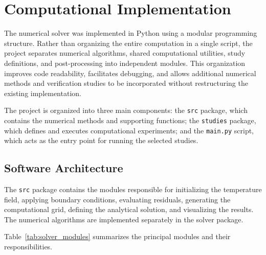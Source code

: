 \section{Computational Implementation}

The numerical solver was implemented in Python using a modular programming structure. Rather than organizing the entire computation in a single script, the project separates numerical algorithms, shared computational utilities, study definitions, and post-processing into independent modules. This organization improves code readability, facilitates debugging, and allows additional numerical methods and verification studies to be incorporated without restructuring the existing implementation.

The project is organized into three main components: the \texttt{src} package, which contains the numerical methods and supporting functions; the \texttt{studies} package, which defines and executes computational experiments; and the \texttt{main.py} script, which acts as the entry point for running the selected studies.


\subsection{Software Architecture}

The \texttt{src} package contains the modules responsible for initializing the temperature field, applying boundary conditions, evaluating residuals, generating the computational grid, defining the analytical solution, and visualizing the results. The numerical algorithms are implemented separately in the solver package.

Table~\ref{tab:solver_modules} summarizes the principal modules and their responsibilities.

